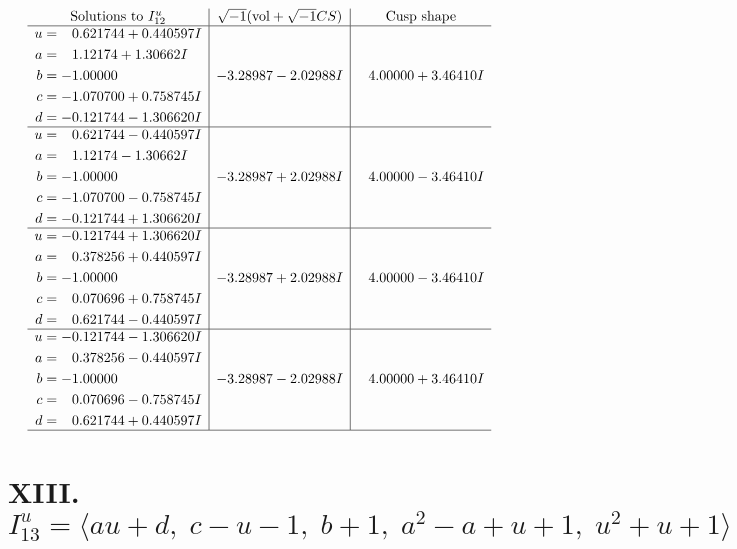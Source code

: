 \documentclass[1p]{elsarticle_modified}
\theoremstyle{definition}
\newcommand{\I}{\sqrt{-1}}
\begin{document}
$$\begin{array}{c|c|c}  
\text{Solutions to }I^u_{12}& \I (\text{vol} + \sqrt{-1}CS) & \text{Cusp shape}\\
 \hline 
\begin{aligned}
u &= \phantom{-}0.621744 + 0.440597 I \\
a &= \phantom{-}1.12174 + 1.30662 I \\
b &= -1.00000\phantom{ +0.000000I} \\
c &= -1.070700 + 0.758745 I \\
d &= -0.121744 - 1.306620 I\end{aligned}
 & -3.28987 - 2.02988 I & \phantom{-}4.00000 + 3.46410 I \\ \hline\begin{aligned}
u &= \phantom{-}0.621744 - 0.440597 I \\
a &= \phantom{-}1.12174 - 1.30662 I \\
b &= -1.00000\phantom{ +0.000000I} \\
c &= -1.070700 - 0.758745 I \\
d &= -0.121744 + 1.306620 I\end{aligned}
 & -3.28987 + 2.02988 I & \phantom{-}4.00000 - 3.46410 I \\ \hline\begin{aligned}
u &= -0.121744 + 1.306620 I \\
a &= \phantom{-}0.378256 + 0.440597 I \\
b &= -1.00000\phantom{ +0.000000I} \\
c &= \phantom{-}0.070696 + 0.758745 I \\
d &= \phantom{-}0.621744 - 0.440597 I\end{aligned}
 & -3.28987 + 2.02988 I & \phantom{-}4.00000 - 3.46410 I \\ \hline\begin{aligned}
u &= -0.121744 - 1.306620 I \\
a &= \phantom{-}0.378256 - 0.440597 I \\
b &= -1.00000\phantom{ +0.000000I} \\
c &= \phantom{-}0.070696 - 0.758745 I \\
d &= \phantom{-}0.621744 + 0.440597 I\end{aligned}
 & -3.28987 - 2.02988 I & \phantom{-}4.00000 + 3.46410 I\\
 \hline 
 \end{array}$$\newpage\newpage\renewcommand{\arraystretch}{1}
\centering \section*{XIII. $I^u_{13}= \langle a u+d,\;c- u-1,\;b+1,\;a^2- a+u+1,\;u^2+u+1 \rangle$}
\end{document}
